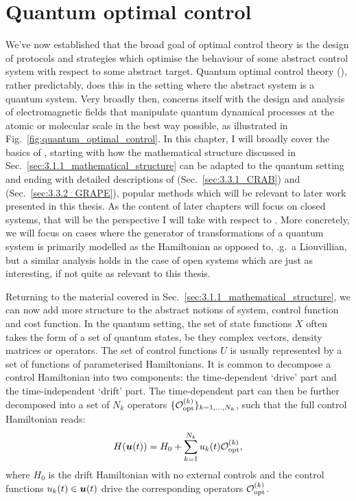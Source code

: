 \section{Quantum optimal control}\label{sec:3.2_Quantum_optimal_control}

We've now established that the broad goal of optimal control theory is the design of protocols and strategies which optimise the behaviour of some abstract control system with respect to some abstract target. Quantum optimal control theory (), rather predictably, does this in the setting where the abstract system is a quantum system. Very broadly then,  concerns itself with the design and analysis of electromagnetic fields that manipulate quantum dynamical processes at the atomic or molecular scale in the best way possible, as illustrated in Fig.~\ref{fig:quantum_optimal_control}. In this chapter, I will broadly cover the basics of , starting with how the mathematical structure discussed in Sec.~\ref{sec:3.1.1_mathematical_structure} can be adapted to the quantum setting and ending with detailed descriptions of  (Sec.~\ref{sec:3.3.1_CRAB}) and  (Sec.~\ref{sec:3.3.2_GRAPE}), popular  methods which will be relevant to later work presented in this thesis. As the content of later chapters will focus on closed systems, that will be the perspective I will take with respect to . More concretely, we will focus on cases where the generator of transformations of a quantum system is primarily modelled as the Hamiltonian as opposed to, \@e.g.~a Liouvillian, but a similar analysis holds in the case of open systems which are just as interesting, if not quite as relevant to this thesis.

Returning to the material covered in Sec.~\ref{sec:3.1.1_mathematical_structure}, we can now add more structure to the abstract notions of system, control function and cost function. In the quantum setting, the set of state functions $X$ often takes the form of a set of quantum states, be they complex vectors, density matrices or operators. The set of control functions $U$ is usually represented by a set of functions of parameterised Hamiltonians. It is common to decompose a control Hamiltonian into two components: the time-dependent `drive' part and the time-independent `drift' part. The time-dependent part can then be further decomposed into a set of $N_k$ operators $\{\mathcal{O}_{\rm opt}^{(k)}\}_{k=1,...,N_k}$, such that the full control Hamiltonian reads:
\begin{equation}\label{eq:optimal_control_H}
    H(\boldsymbol{u}(t)) = H_0 + \sum_{k = 1}^{N_k} u_k(t) \mathcal{O}_{\rm opt}^{(k)},
\end{equation}
where $H_0$ is the drift Hamiltonian with no external controls and the control functions $u_k(t) \in \boldsymbol{u}(t)$ drive the corresponding operators $\mathcal{O}_{\rm opt}^{(k)}$.

